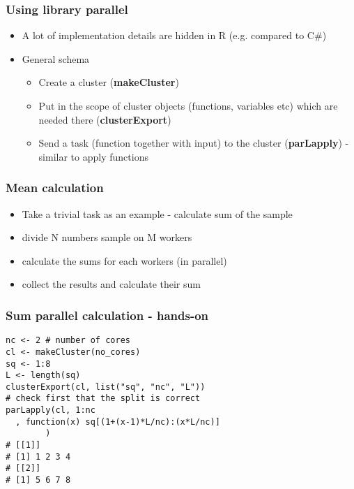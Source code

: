 \documentclass[bigger]{beamer}
\begin{document}
\begin{frame}
\frametitle{Using library parallel}
\label{sec-3-3}
\begin{itemize}

\item A lot of implementation details are hidden in R (e.g. compared to C\#)
\label{sec-3-3-1}%

\item General schema
\label{sec-3-3-2}%
\begin{itemize}

\item Create a cluster (\textbf{makeCluster})
\label{sec-3-3-2-1}%

\item Put in the scope of cluster objects (functions, variables etc) which are needed there (\textbf{clusterExport})
\label{sec-3-3-2-2}%

\item Send a task (function together with input) to the cluster (\textbf{parLapply}) - similar to apply functions
\label{sec-3-3-2-3}%
\end{itemize} %
\end{itemize} %
\end{frame}
\begin{frame}
\frametitle{Mean calculation}
\label{sec-3-4}
\begin{itemize}

\item Take a trivial task as an example - calculate sum of the sample
\label{sec-3-4-1}%

\item divide N numbers sample on M workers
\label{sec-3-4-2}%

\item calculate the sums for each workers (in parallel)
\label{sec-3-4-3}%

\item collect the results and calculate their sum
\label{sec-3-4-4}%
\end{itemize} %
\end{frame}
\begin{frame}[fragile]
\frametitle{Sum parallel calculation - hands-on}
\label{sec-3-5}


\begin{verbatim}
nc <- 2 # number of cores
cl <- makeCluster(no_cores)
sq <- 1:8
L <- length(sq)
clusterExport(cl, list("sq", "nc", "L"))
# check first that the split is correct
parLapply(cl, 1:nc
  , function(x) sq[(1+(x-1)*L/nc):(x*L/nc)]
        )
# [[1]] 
# [1] 1 2 3 4
# [[2]]
# [1] 5 6 7 8
\end{verbatim}
\end{frame}
\end{document}
